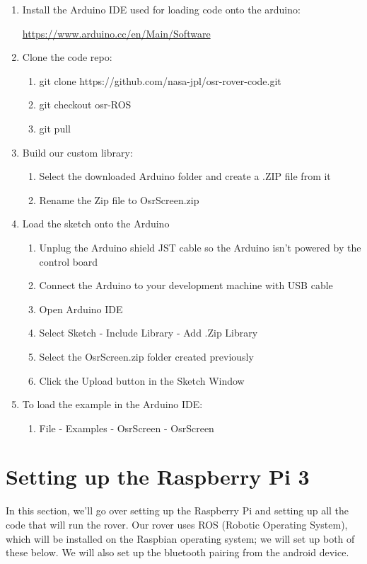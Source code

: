 \documentclass{article}
\begin{document}
\begin{enumerate} 
\item Install the Arduino IDE used for loading code onto the arduino:

	\href{https://www.arduino.cc/en/Main/Software}{https://www.arduino.cc/en/Main/Software}

\item Clone the code repo:
	\begin{enumerate}
	\item git clone https://github.com/nasa-jpl/osr-rover-code.git
	\item git checkout osr-ROS
	\item git pull
	\end{enumerate}

\item Build our custom library:
	\begin{enumerate}
	\item Select the downloaded Arduino folder and create a .ZIP file from it
	\item Rename the Zip file to OsrScreen.zip
	\end{enumerate}

\item Load the sketch onto the Arduino
	\begin{enumerate}
	\item Unplug the Arduino shield JST cable so the Arduino isn't powered by the control board
	\item Connect the Arduino to your development machine with USB cable
	\item Open Arduino IDE
	\item Select Sketch - Include Library - Add .Zip Library 
	\item Select the OsrScreen.zip folder created previously
	\item Click the Upload button in the Sketch Window	
	\end{enumerate}

\item To load the example in the Arduino IDE: 
	\begin{enumerate}
	\item File - Examples - OsrScreen - OsrScreen 
	\end{enumerate}

\end{enumerate}

\section{Setting up the Raspberry Pi 3}
In this section, we'll go over setting up the Raspberry Pi and setting up all the code that will run the rover. Our rover uses ROS (Robotic Operating System), which will be installed on the Raspbian operating system; we will set up both of these below.  We will also set up the bluetooth pairing from the android device.
\end{document}
